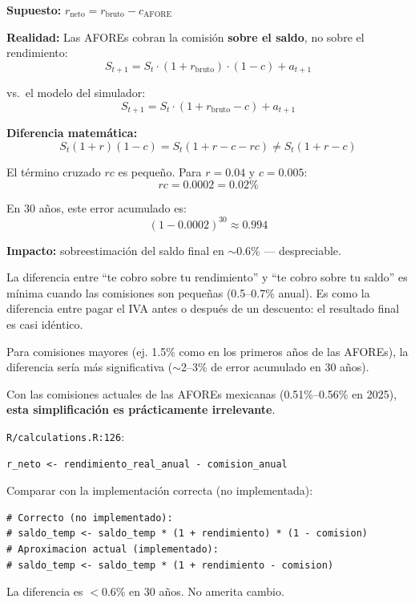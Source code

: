 \documentclass[11pt,a4paper]{report}
\begin{document}
\begin{tcolorbox}[colback=blue!5!white, colframe=blue!75!black, title=\textbf{Definici\'on Formal}]
\textbf{Supuesto:} $r_{\text{neto}} = r_{\text{bruto}} - c_{\text{AFORE}}$

\textbf{Realidad:} Las AFOREs cobran la comisi\'on \textbf{sobre el saldo}, no sobre el rendimiento:
\[
  S_{t+1} = S_t \cdot (1 + r_{\text{bruto}}) \cdot (1 - c) + a_{t+1}
\]

vs.\ el modelo del simulador:
\[
  S_{t+1} = S_t \cdot (1 + r_{\text{bruto}} - c) + a_{t+1}
\]

\textbf{Diferencia matem\'atica:}
\[
  S_t(1+r)(1-c) = S_t(1 + r - c - rc) \neq S_t(1 + r - c)
\]

El t\'ermino cruzado $rc$ es peque\~no. Para $r = 0.04$ y $c = 0.005$:
\[
  rc = 0.0002 = 0.02\%
\]

En 30 a\~nos, este error acumulado es:
\[
  (1 - 0.0002)^{30} \approx 0.994
\]

\textbf{Impacto:} sobreestimaci\'on del saldo final en $\sim$0.6\% --- despreciable.
\end{tcolorbox}

\begin{tcolorbox}[colback=green!5!white, colframe=green!50!black, title=\textbf{Intuici\'on}]
La diferencia entre ``te cobro sobre tu rendimiento'' y ``te cobro sobre tu saldo'' es m\'inima cuando las comisiones son peque\~nas (0.5--0.7\% anual). Es como la diferencia entre pagar el IVA antes o despu\'es de un descuento: el resultado final es casi id\'entico.

Para comisiones mayores (ej. 1.5\% como en los primeros a\~nos de las AFOREs), la diferencia ser\'ia m\'as significativa ($\sim$2--3\% de error acumulado en 30 a\~nos).

Con las comisiones actuales de las AFOREs mexicanas (0.51\%--0.56\% en 2025), \textbf{esta simplificaci\'on es pr\'acticamente irrelevante}.
\end{tcolorbox}

\begin{tcolorbox}[colback=orange!5!white, colframe=orange!75!black, title=\textbf{Aplicaci\'on en C\'odigo}]
\texttt{R/calculations.R:126}:
\begin{lstlisting}
r_neto <- rendimiento_real_anual - comision_anual
\end{lstlisting}

Comparar con la implementaci\'on correcta (no implementada):
\begin{lstlisting}
# Correcto (no implementado):
# saldo_temp <- saldo_temp * (1 + rendimiento) * (1 - comision)
# Aproximacion actual (implementado):
# saldo_temp <- saldo_temp * (1 + rendimiento - comision)
\end{lstlisting}

La diferencia es $<$0.6\% en 30 a\~nos. No amerita cambio.
\end{tcolorbox}
\end{document}
